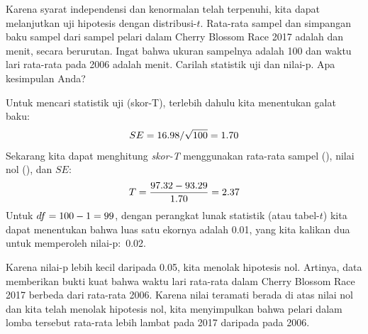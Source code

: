\begin{examplewrap}
\begin{nexample}{Karena syarat independensi
    dan kenormalan telah terpenuhi,
    kita dapat melanjutkan uji hipotesis dengan
    distribusi-$t$.
    Rata-rata sampel dan simpangan baku sampel
    dari sampel
    \cherryblossomn{} pelari dalam
    Cherry Blossom Race 2017
    adalah \cherryblossommean{} dan \cherryblossomsd{} menit,
    secara berurutan.
    Ingat bahwa ukuran sampelnya adalah 100
    dan waktu lari rata-rata pada 2006 adalah
    \cherryblossomnull{} menit.
    Carilah statistik uji dan nilai-p.
    Apa kesimpulan Anda?}

  Untuk mencari statistik uji (skor-T),
  terlebih dahulu kita menentukan galat baku:
  \begin{align*}
  SE
    = 16.98{} / \sqrt{100{}}
    = 1.70{}
  \end{align*}
  Sekarang kita dapat menghitung \emph{skor-T}
  menggunakan rata-rata sampel (\cherryblossommean{}),
  nilai nol (\cherryblossomnull{}), dan $SE$:
  \begin{align*}
  T
    = \frac{97.32{} - 93.29{}}
        {1.70{}}
    = 2.37{}
  \end{align*}
  Untuk $df = 100{} - 1 = 99$,
  dengan perangkat lunak statistik
  (atau tabel-$t$) kita dapat menentukan bahwa luas satu ekornya adalah 0.01,
  yang kita kalikan dua untuk memperoleh nilai-p:~0.02.

  Karena nilai-p lebih kecil daripada 0.05,
  kita menolak hipotesis nol.
  Artinya, data memberikan bukti kuat bahwa waktu lari
  rata-rata dalam Cherry Blossom Race 2017 berbeda
  dari rata-rata 2006.
  Karena nilai teramati berada di atas nilai nol
  dan kita telah menolak hipotesis nol, kita menyimpulkan
  bahwa pelari dalam lomba tersebut rata-rata lebih lambat pada 2017
  daripada pada 2006.
\end{nexample}
\end{examplewrap}


